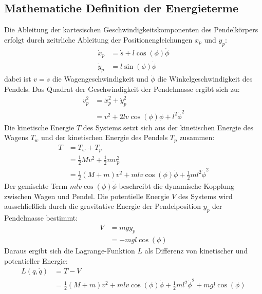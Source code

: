 \subsection{Mathematiche Definition der Energieterme}
Die Ableitung der kartesischen Geschwindigkeitskomponenten des Pendelkörpers erfolgt durch zeitrliche Ableitung der Positionengleichungen $x_p$ und $y_p$:
\begin{align}
    \dot{x}_p &= \dot{s} + l \cos(\phi) \dot{\phi} \\
    \dot{y}_p &= l \sin(\phi) \dot{\phi}
\end{align}
dabei ist $v=\dot{s}$ die Wagengeschwindigkeit und $\dot{\phi}$ die Winkelgeschwindigkeit des Pendels.
Das Quadrat der Geschwindigkeit der Pendelmasse ergibt sich zu:
\begin{align}
    v_p^2 &= \dot{x}_p^2 + \dot{y}_p^2 \\
    &= v^2 + 2 l v \cos(\phi) \dot{\phi} + l^2 \dot{\phi}^2
\end{align}
Die kinetische Energie $T$ des Systems setzt sich aus der kinetischen Energie des Wagens $T_w$ und der kinetischen Energie des Pendels $T_p$ zusammen:
\begin{align}
    T &= T_w + T_p \\
    &= \frac{1}{2} M v^2 + \frac{1}{2} m v_p^2 \\
    &= \frac{1}{2} (M+m) v^2 + m l v \cos(\phi) \dot{\phi} + \frac{1}{2} m l^2 \dot{\phi}^2
\end{align}
Der gemischte Term $m l v \cos(\phi) \dot{\phi}$ beschreibt die dynamische Kopplung zwischen Wagen und Pendel.
Die potentielle Energie $V$ des Systems wird ausschließlich durch die gravitative Energie der Pendelposition $y_p$ der Pendelmasse bestimmt:
\begin{align}
    V &= m g y_p \\
    &= - m g l \cos(\phi)
\end{align}
Daraus ergibt sich die Lagrange-Funktion $L$ als Differenz von kinetischer und potentieller Energie:
\begin{align}
    L(q, \dot{q}) &= T - V \\
    &= \frac{1}{2} (M+m) v^2 + m l v \cos(\phi) \dot{\phi} + \frac{1}{2} m l^2 \dot{\phi}^2 + m g l \cos(\phi)
\end{align}
